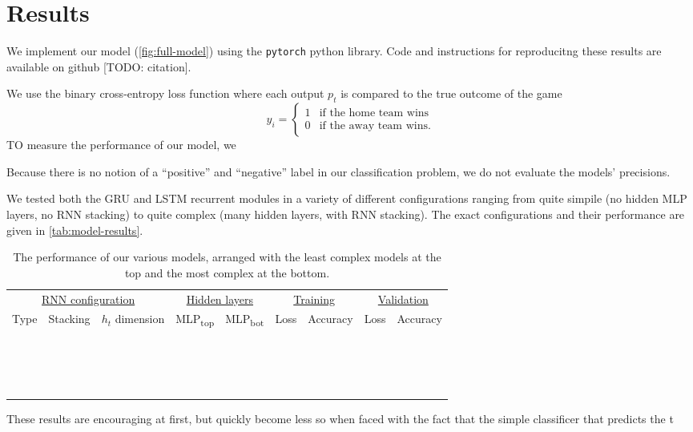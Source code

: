 \section{Results}

We implement our model (\autoref{fig:full-model}) using the \texttt{pytorch} python library. Code and instructions for reproducitng these results are available on github [TODO: citation].

We use the binary cross-entropy loss function where each output $p_t$ is compared to the true outcome of the game
\begin{equation}
	y_i = \begin{cases}
		1 & \text{if the home team wins}  \\
		0 & \text{if the away team wins}.
	\end{cases}
\end{equation}
TO measure the performance of our model, we

Because there is no notion of a ``positive'' and ``negative'' label in our classification problem, we do not evaluate the models' precisions.

We tested both the GRU and LSTM recurrent modules in a variety of different configurations ranging from quite simpile (no hidden MLP layers, no RNN stacking) to quite complex (many hidden layers, with RNN stacking). The exact configurations and their performance are given in \autoref{tab:model-results}.

\begin{table}
	\begin{tabular}{ccccc | cccc}
		\multicolumn{3}{c}{\underline{RNN configuration}} & \multicolumn{2}{c|}{\underline{Hidden layers}} & \multicolumn{2}{c}{\underline{Training}} & \multicolumn{2}{c}{\underline{Validation}}                                                              \\
		Type                                              & Stacking                                       & $h_t$ dimension                          & MLP\textsubscript{top}                     & MLP\textsubscript{bot} & Loss & Accuracy & Loss & Accuracy \\
		\hline
		\\
		\\
		\\
		\\
		\\
		\\
		\\
		\\
		\\
		\\
		\\
		\\
		\\
		\\
		\\
		\\
	\end{tabular}
	\caption{The performance of our various models, arranged with the least complex models at the top and the most complex at the bottom.}
	\label{tab:model-results}
\end{table}

These results are encouraging at first, but quickly become less so when faced with the fact that the simple classificer that predicts the t



